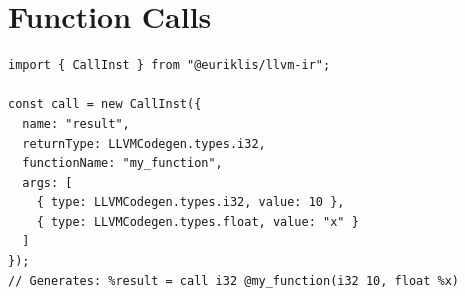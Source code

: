 \section{Function Calls}

\begin{lstlisting}[style=ts]
import { CallInst } from "@euriklis/llvm-ir";

const call = new CallInst({
  name: "result",
  returnType: LLVMCodegen.types.i32,
  functionName: "my_function",
  args: [
    { type: LLVMCodegen.types.i32, value: 10 },
    { type: LLVMCodegen.types.float, value: "x" }
  ]
});
// Generates: %result = call i32 @my_function(i32 10, float %x)
\end{lstlisting}

